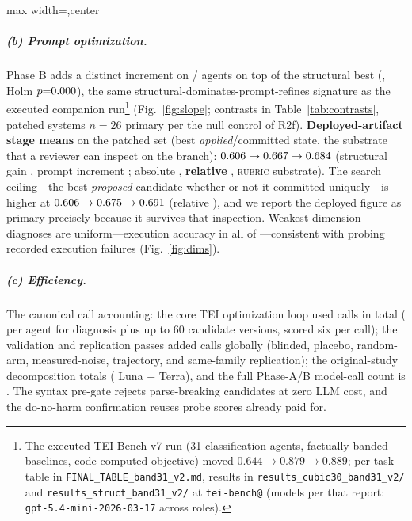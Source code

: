 \documentclass[11pt]{article}
\begin{document}
\begin{table}[t]\centering
\caption{Apply anatomy of six thousand proposals (structural discipline of
the loop).}
\label{tab:apply}\footnotesize
\begin{adjustbox}{max width=\linewidth,center}\end{adjustbox}
\end{table}

\subparagraph{(b) Prompt optimization.}
Phase B adds a distinct increment on \swPromptAdds/\swN{} agents on top of the
structural best (\swDeltaFS{}, Holm $p{=}0.000$), the same
structural-dominates-prompt-refines signature as the executed companion
run\footnote{The executed TEI-Bench v7 run (31 classification agents,
factually banded baselines, code-computed objective) moved
$0.644\to0.879\to0.889$; per-task table in
\texttt{FINAL\_TABLE\_band31\_v2.md}, results in
\texttt{results\_cubic30\_band31\_v2/} and \texttt{results\_struct\_band31\_v2/}
at \texttt{tei-bench@\swTeibenchSHA} (models per that report:
\texttt{gpt-5.4-mini-2026-03-17} across roles).} (Fig.~\ref{fig:slope};
contrasts in Table~\ref{tab:contrasts}, patched systems $n{=}26$ primary
per the null control of R2f). \textbf{Deployed-artifact stage means} on the
patched set (best \emph{applied}/committed state, the substrate that a reviewer
can inspect on the branch): $0.606\to0.667\to0.684$
(structural gain \swAppStructGain, prompt increment \swAppPromptGain; absolute
\swAppAbsGain, \textbf{relative \swAppRelGain}, \textsc{rubric} substrate). The
search ceiling---the best \emph{proposed} candidate whether or not it committed
uniquely---is higher at $0.606\to0.675\to0.691$ (relative
\swPropRelGain), and we report the deployed figure as primary precisely because
it survives that inspection. Weakest-dimension diagnoses are uniform---execution
accuracy in all \swWeakEA{} of \swN{}---consistent with probing recorded
execution failures (Fig.~\ref{fig:dims}).

\subparagraph{(c) Efficiency.}
The canonical call accounting: the core TEI optimization loop used
\swCallsOpt{} calls in total (\swCallsOptPerAgent{} per agent for diagnosis
plus up to 60 candidate versions, scored six per call); the validation and
replication passes added \swCallsValidation{} calls globally (blinded,
placebo, random-arm, measured-noise, trajectory, and same-family
replication); the original-study decomposition totals \swCallsAll{}
(\swLunaCalls{} Luna $+$ \swTerraCalls{} Terra), and the full Phase-A/B
model-call count is \swCallsCanon{}. The syntax pre-gate rejects parse-breaking
candidates at zero LLM cost, and the do-no-harm confirmation reuses probe
scores already paid for.
\end{document}
